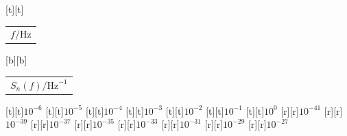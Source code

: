 %    
%
%
\begin{psfrags}%
\psfragscanon%
%
[t][t]{\color[rgb]{0,0,0}\setlength{\tabcolsep}{0pt}\begin{tabular}{c}{\Large $f/\mathrm{Hz}$}\end{tabular}}%
[b][b]{\color[rgb]{0,0,0}\setlength{\tabcolsep}{0pt}\begin{tabular}{c}{\Large $S_n(f)/\mathrm{Hz}^{-1}$\vspace{2.5mm}}\end{tabular}}%
%
[t][t]{$10^{-6}$}%
[t][t]{$10^{-5}$}%
[t][t]{$10^{-4}$}%
[t][t]{$10^{-3}$}%
[t][t]{$10^{-2}$}%
[t][t]{$10^{-1}$}%
[t][t]{$10^{0}$}%
%
[r][r]{$10^{-41}$}%
[r][r]{$10^{-39}$}%
[r][r]{$10^{-37}$}%
[r][r]{$10^{-35}$}%
[r][r]{$10^{-33}$}%
[r][r]{$10^{-31}$}%
[r][r]{$10^{-29}$}%
[r][r]{$10^{-27}$}%
%
%
\end{psfrags}%
%
